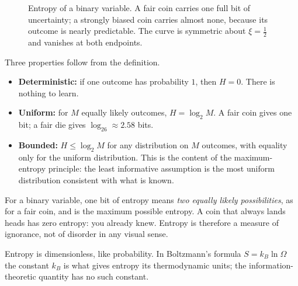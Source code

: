\begin{figure}[htbp]
\centering
{}
\caption{Entropy of a binary variable. A fair coin carries one full bit of uncertainty; a strongly biased coin carries almost none, because its outcome is nearly predictable. The curve is symmetric about $\xi=\tfrac12$ and vanishes at both endpoints.}\label{fig:lec02-entropy-binary}
\end{figure}

Three properties follow from the definition.
\begin{itemize}
\item \textbf{Deterministic:} if one outcome has probability $1$, then $H=0$. There is nothing to learn.
\item \textbf{Uniform:} for $M$ equally likely outcomes, $H=\log_2M$. A fair coin gives one bit; a fair die gives $\log_26\approx2.58$ bits.
\item \textbf{Bounded:} $H\leq\log_2M$ for any distribution on $M$ outcomes, with equality only for the uniform distribution. This is the content of the maximum-entropy principle: the least informative assumption is the most uniform distribution consistent with what is known.
\end{itemize}

For a binary variable, one bit of entropy means \emph{two equally likely possibilities}, as for a fair coin, and is the maximum possible entropy. A coin that always lands heads has zero entropy: you already knew. Entropy is therefore a measure of ignorance, not of disorder in any visual sense.

\begin{remark}
Entropy is dimensionless, like probability. In Boltzmann's formula $S=k_B\ln\Omega$ the constant $k_B$ is what gives entropy its thermodynamic units; the information-theoretic quantity has no such constant.
\end{remark}

